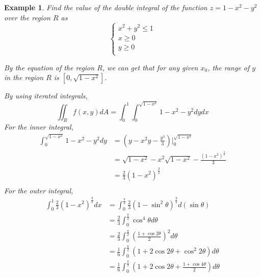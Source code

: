 \documentclass{article}
\newtheorem{example}{Example}
\begin{document}
\begin{example}
  Find the value of the double integral of the function $z = 1 - x^2 - y^2$ over 
  the region $R$ as 
  \begin{equation*}
    \begin{cases}
      x^2 + y^2 \leq 1 \\
      x \geq 0 \\
      y \geq 0 \\
    \end{cases}
  \end{equation*}

  By the equation of the region $R$, we can get that for any given $x_0$, the 
  range of $y$ in the region $R$ is $[0, \sqrt{1 - x^2}]$.

  By using iterated integrals,
  \begin{equation*}
    \iint_R f(x, y) dA = \int_0^1 \int_0^{\sqrt{1 - x^2}} 1 - x^2 - y^2 dy dx
  \end{equation*}
  For the inner integral,
  \begin{equation*}
    \begin{split}
      \int_0^{\sqrt{1 - x^2}} 1 - x^2 - y^2 dy &= (y - x^2y - \frac{y^3}{3})|_0^{\sqrt{1 - x^2}} \\
                                               &= \sqrt{1 - x^2} - x^2\sqrt{1 - x^2} - \frac{(1 - x^2)^{\frac{3}{2}}}{3}\\
                                               &= \frac{2}{3}(1 - x^2)^{\frac{3}{2}} \\
    \end{split}
  \end{equation*}
  For the outer integral,
  \begin{equation*}
    \begin{split}
      \int_0^1 \frac{2}{3}(1 - x^2)^{\frac{3}{2}} dx &= \int_0^{\frac{\pi}{2}} \frac{2}{3}(1 - \sin^2\theta)^{\frac{3}{2}} d(\sin\theta) \\
                                                     &= \frac{2}{3} \int_0^{\frac{\pi}{2}} \cos^4\theta d\theta \\
                                                     &= \frac{2}{3} \int_0^{\frac{\pi}{2}} (\frac{1 + \cos 2\theta}{2})^2 d\theta \\
                                                     &= \frac{1}{6} \int_0^{\frac{\pi}{2}} (1 + 2\cos2\theta + \cos^2 2\theta) d\theta \\
                                                     &= \frac{1}{6} \int_0^{\frac{\pi}{2}} (1 + 2\cos2\theta + \frac{1 + \cos 4\theta}{2}) d\theta \\

\end{split}
\end{equation*}
\end{example}
\end{document}
